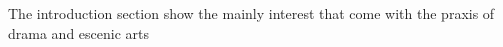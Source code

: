 The introduction section show the mainly interest that come with the praxis of drama and escenic arts